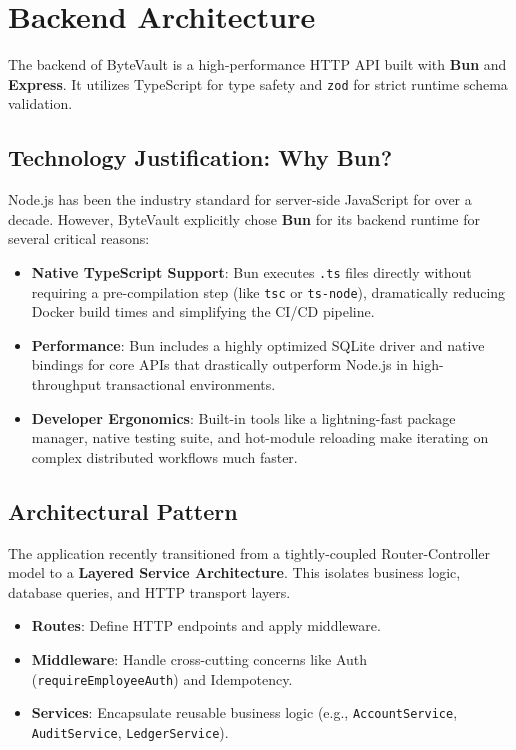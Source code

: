 \section{Backend Architecture}

The backend of ByteVault is a high-performance HTTP API built with \textbf{Bun} and \textbf{Express}. It utilizes TypeScript for type safety and \texttt{zod} for strict runtime schema validation.

\subsection{Technology Justification: Why Bun?}
Node.js has been the industry standard for server-side JavaScript for over a decade. However, ByteVault explicitly chose \textbf{Bun} for its backend runtime for several critical reasons:
\begin{itemize}
    \item \textbf{Native TypeScript Support}: Bun executes \texttt{.ts} files directly without requiring a pre-compilation step (like \texttt{tsc} or \texttt{ts-node}), dramatically reducing Docker build times and simplifying the CI/CD pipeline.
    \item \textbf{Performance}: Bun includes a highly optimized SQLite driver and native bindings for core APIs that drastically outperform Node.js in high-throughput transactional environments.
    \item \textbf{Developer Ergonomics}: Built-in tools like a lightning-fast package manager, native testing suite, and hot-module reloading make iterating on complex distributed workflows much faster.
\end{itemize}

\subsection{Architectural Pattern}
The application recently transitioned from a tightly-coupled Router-Controller model to a \textbf{Layered Service Architecture}. This isolates business logic, database queries, and HTTP transport layers.

\begin{itemize}
    \item \textbf{Routes}: Define HTTP endpoints and apply middleware.
    \item \textbf{Middleware}: Handle cross-cutting concerns like Auth (\texttt{requireEmployeeAuth}) and Idempotency.
    \item \textbf{Services}: Encapsulate reusable business logic (e.g., \texttt{AccountService}, \texttt{AuditService}, \texttt{LedgerService}).
\end{itemize}

